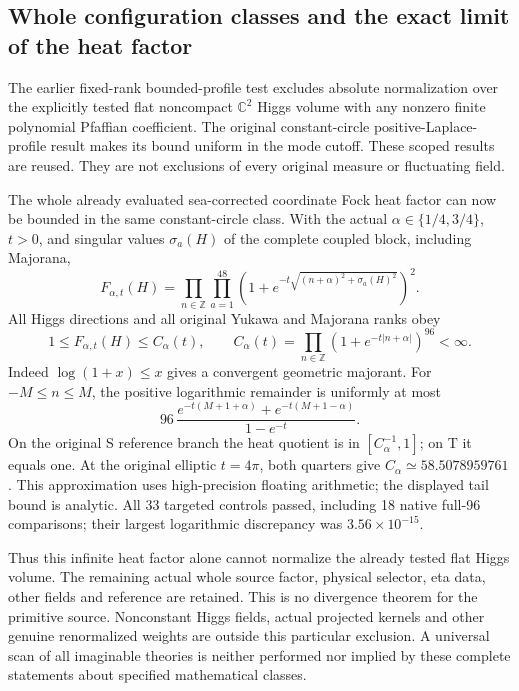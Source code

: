 \subsection*{Whole configuration classes and the exact limit of the heat factor}
The earlier fixed-rank bounded-profile test excludes absolute
normalization over the explicitly tested flat noncompact \(\mathbb C^2\)
Higgs volume with any nonzero finite polynomial Pfaffian coefficient.
The original constant-circle positive-Laplace-profile result makes its
bound uniform in the mode cutoff. These scoped results are reused.
They are not exclusions of every original measure or fluctuating field.

The whole already evaluated sea-corrected coordinate Fock heat factor
can now be bounded in the same constant-circle class. With the actual
\(\alpha\in\{1/4,3/4\}\), \(t>0\), and singular values
\(\sigma_a(H)\) of the complete coupled block, including Majorana,
\[
 F_{\alpha,t}(H)=\prod_{n\in\mathbb Z}\prod_{a=1}^{48}
 \left(1+e^{-t\sqrt{(n+\alpha)^2+\sigma_a(H)^2}}\right)^2.
\]
All Higgs directions and all original Yukawa and Majorana ranks obey
\[
 1\le F_{\alpha,t}(H)\le C_\alpha(t),\qquad
 C_\alpha(t)=\prod_{n\in\mathbb Z}(1+e^{-t|n+\alpha|})^{96}<\infty.
\]
Indeed \(\log(1+x)\le x\) gives a convergent geometric majorant.
For \(-M\le n\le M\), the positive logarithmic remainder is uniformly
at most
\[
 96\,\frac{e^{-t(M+1+\alpha)}+e^{-t(M+1-\alpha)}}{1-e^{-t}}.
\]
On the original S reference branch the heat quotient is in
\([C_\alpha^{-1},1]\); on T it equals one. At the original elliptic
\(t=4\pi\), both quarters give
\(C_\alpha\simeq58.5078959761\). This approximation uses high-precision
floating arithmetic; the displayed tail bound is analytic.
All 33 targeted controls passed, including 18 native full-96 comparisons;
their largest logarithmic discrepancy was \(3.56\times10^{-15}\).

Thus this infinite heat factor alone cannot normalize the already
tested flat Higgs volume. The remaining actual whole source factor,
physical selector, eta data, other fields and reference are retained.
This is no divergence theorem for the primitive source. Nonconstant
Higgs fields, actual projected kernels and other genuine renormalized
weights are outside this particular exclusion. A universal scan of
all imaginable theories is neither performed nor implied by these
complete statements about specified mathematical classes.

